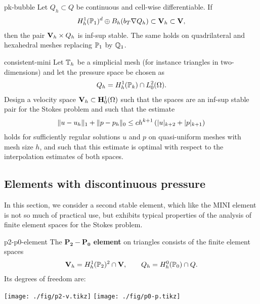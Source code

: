 \begin{Corollary}{pk-bubble}
  Let $Q_h\subset Q$ be continuous and cell-wise differentiable. If
  \begin{gather}
    H^1_h(\P_1)^d\oplus B_h(b_\cell\nabla Q_h) \subset \vV_h \subset \vV,
  \end{gather}
  then the pair $\vV_h\times Q_h$ is inf-sup stable. The same holds on
  quadrilateral and hexahedral meshes replacing $\P_1$ by $\Q_1$.
\end{Corollary}

\begin{Problem}{consistent-mini}
  Let $\mesh_h$ be a simplicial mesh (for instance triangles in
  two-dimensions) and let the pressure space be chosen as
  \begin{gather}
    Q_h = H^1_h(\P_k) \cap L^2_0(\domain).
  \end{gather}
  Design a velocity space $\vV_h\subset \vH^1_0(\domain)$ such that
  the spaces are an inf-sup stable pair for the Stokes problem and
  such that the estimate
  \begin{gather}
    \norm{u-u_h}_1 + \norm{p-p_h}_0 \le c h^{k+1} \left(\abs{u}_{k+2} + \abs{p}_{k+1}\right)
  \end{gather}
  holds for sufficiently regular solutions $u$ and $p$ on
  quasi-uniform meshes with mesh size $h$, and such that this estimate
  is optimal with respect to the interpolation estimates of both
  spaces.
\end{Problem}

\subsection{Elements with discontinuous pressure}

\begin{intro}
  In this section, we consider a second stable element, which like
  the MINI element is not so much of practical use, but exhibits
  typical properties of the analysis of finite element spaces for the
  Stokes problem.
\end{intro}

\begin{Definition}{p2-p0-element}
  The \textbf{$\mathbf{P_2-P_0}$ element} on triangles consists of the finite
  element spaces
  \begin{gather}
    \vV_h = H^1_h(\P_2)^2 \cap \vV,
    \qquad
    Q_h = H^0_h(\P_0) \cap Q.
  \end{gather}
  Its degrees of freedom are:
    \begin{center}
    \texttt{[image: ./fig/p2-v.tikz]}
    \hspace{1cm}
    \texttt{[image: ./fig/p0-p.tikz]}
  \end{center}
\end{Definition}

